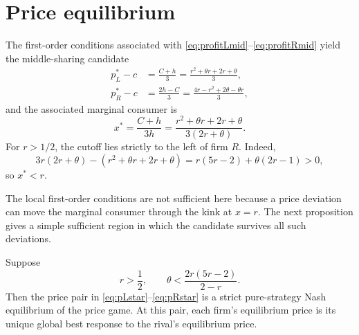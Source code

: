 \section{Price equilibrium}\label{sec:equilibrium}

The first-order conditions associated with \eqref{eq:profitLmid}--\eqref{eq:profitRmid} yield the middle-sharing candidate
\begin{align}
p_L^*-c
&=\frac{C+h}{3}
 =\frac{r^2+\theta r+2r+\theta}{3},
\label{eq:pLstar}\\
p_R^*-c
&=\frac{2h-C}{3}
 =\frac{4r-r^2+2\theta-\theta r}{3},
\label{eq:pRstar}
\end{align}
and the associated marginal consumer is
\begin{equation}
x^*=\frac{C+h}{3h}
=\frac{r^2+\theta r+2r+\theta}{3(2r+\theta)}.
\label{eq:xstar}
\end{equation}
For $r>1/2$, the cutoff lies strictly to the left of firm $R$. Indeed,
\begin{equation}
3r(2r+\theta)-(r^2+\theta r+2r+\theta)
=r(5r-2)+\theta(2r-1)>0,
\end{equation}
so $x^*<r$.

The local first-order conditions are not sufficient here because a price deviation can move the marginal consumer through the kink at $x=r$. The next proposition gives a simple sufficient region in which the candidate survives all such deviations.

\begin{proposition}\label{prop:global}
Suppose
\begin{equation}
r>\frac12,
\qquad
\theta<\frac{2r(5r-2)}{2-r}.
\label{eq:globalregion}
\end{equation}
Then the price pair in \eqref{eq:pLstar}--\eqref{eq:pRstar} is a strict pure-strategy Nash equilibrium of the price game. At this pair, each firm's equilibrium price is its unique global best response to the rival's equilibrium price.
\end{proposition}

